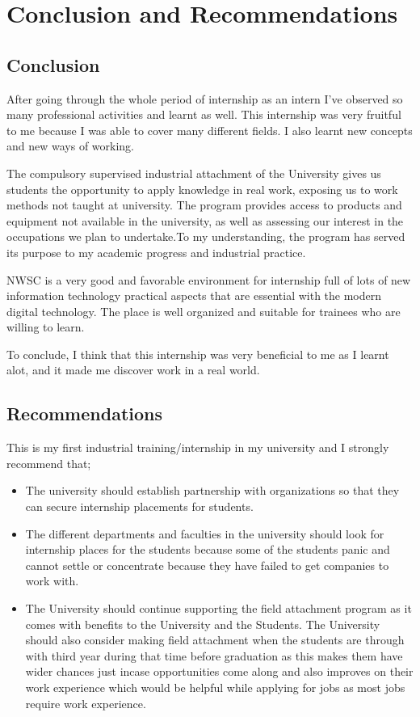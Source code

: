 \documentclass{article}
\begin{document}
\section{Conclusion and Recommendations}
\subsection{Conclusion}
After going through the whole period of internship as an intern I've observed so many professional activities and learnt as well. This internship was very fruitful to me because I was able  to cover many different fields. I also learnt new concepts and new ways of working.
\par The compulsory supervised industrial attachment of the University gives us  students  the opportunity to apply knowledge in real work, exposing us to work methods not taught at university. The program provides access to products and equipment not available in the university, as well as assessing our interest in the occupations we plan to undertake.To my understanding, the program has served its purpose to my academic progress and industrial practice.
\par NWSC  is a very good and favorable environment for internship full of lots of new information technology practical aspects that are essential with the modern digital technology. The place is well organized and suitable for trainees who are willing to learn.
\par To conclude, I think that this internship was very beneficial to me as I learnt alot, and it made me discover work in a real world.
\subsection{Recommendations}
This is my first industrial training/internship in my university and I strongly recommend that;
\begin{itemize}
\item The university should establish partnership with organizations so that they can secure internship placements for students.
\item The different departments and faculties in the university should look for internship places for the students because some of the students panic and cannot settle or concentrate because they have failed to get companies to work with.
\item The University should continue supporting the field attachment program as it comes with benefits to the University and the Students. The University should also consider making field attachment when the students are through with third year during that time before graduation  as this makes them have wider chances just incase opportunities come along and also improves on their work experience which would be helpful while applying for jobs as most jobs require work experience.
\end{itemize}
\newpage
\end{document}
